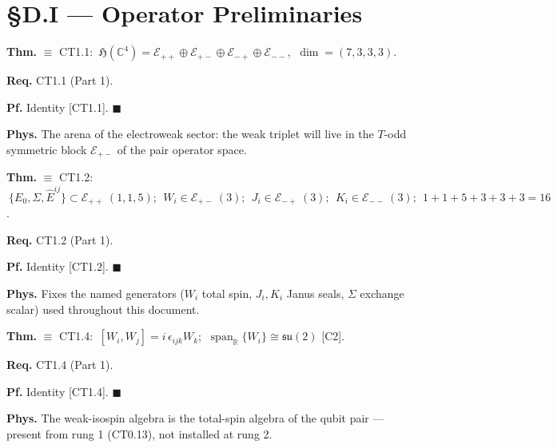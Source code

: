 \section[§D.I — Operator Preliminaries]{\texorpdfstring{§D.I — Operator Preliminaries}{SD.I - Operator Preliminaries}}

\begin{theorem}\label{tag:EW-1}
\textbf{Thm.} $\equiv$ CT1.1: $\ \mathfrak H(\mathbb C^4)=\mathcal E_{++}\oplus\mathcal E_{+-}\oplus\mathcal E_{-+}\oplus\mathcal E_{--}$, $\ \dim=(7,3,3,3)$.

\textbf{Req.} CT1.1 (Part 1).

\textbf{Pf.} Identity [CT1.1]. $\blacksquare$

\textbf{Phys.} The arena of the electroweak sector: the weak triplet will live in the $T$-odd symmetric block $\mathcal E_{+-}$ of the pair operator space.

\end{theorem}

\begin{theorem}\label{tag:EW-2}
\textbf{Thm.} $\equiv$ CT1.2: $\ \{E_0,\Sigma,\hat E^{ij}\}\subset\mathcal E_{++}\ (1,1,5);\ \ W_i\in\mathcal E_{+-}\ (3);\ \ J_i\in\mathcal E_{-+}\ (3);\ \ K_i\in\mathcal E_{--}\ (3);\ \ 1{+}1{+}5{+}3{+}3{+}3=16$.

\textbf{Req.} CT1.2 (Part 1).

\textbf{Pf.} Identity [CT1.2]. $\blacksquare$

\textbf{Phys.} Fixes the named generators ($W_i$ total spin, $J_i,K_i$ Janus seals, $\Sigma$ exchange scalar) used throughout this document.

\end{theorem}

\begin{theorem}\label{tag:EW-3}
\textbf{Thm.} $\equiv$ CT1.4: $\ [W_i,W_j]=i\,\epsilon_{ijk}W_k$; $\ \operatorname{span}_{\mathbb R}\{W_i\}\cong\mathfrak{su}(2)$ [C2].

\textbf{Req.} CT1.4 (Part 1).

\textbf{Pf.} Identity [CT1.4]. $\blacksquare$

\textbf{Phys.} The weak-isospin algebra is the total-spin algebra of the qubit pair — present from rung 1 (CT0.13), not installed at rung 2.

\end{theorem}

